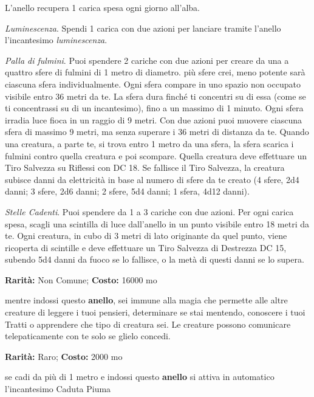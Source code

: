 \begin{multicols}{2}
L'anello recupera 1 carica spesa ogni giorno all'alba.

\emph{Luminescenza}. Spendi 1 carica con due azioni per lanciare tramite l'anello l'incantesimo \emph{luminescenza}.

\emph{Palla di fulmini}. Puoi spendere 2 cariche con due azioni per creare da una a quattro sfere di fulmini di 1 metro di diametro. più sfere crei, meno potente sarà ciascuna sfera individualmente.
Ogni sfera compare in uno spazio non occupato visibile entro 36 metri da te. La sfera dura finché ti concentri su di essa (come se ti concentrassi su di un incantesimo), fino a un massimo di 1 minuto. Ogni sfera irradia luce fioca in un raggio di 9 metri. Con due azioni puoi muovere ciascuna sfera di massimo 9 metri, ma senza superare i 36 metri di distanza da te. Quando una creatura, a parte te, si trova entro 1 metro da una sfera, la sfera scarica i fulmini contro quella creatura e poi scompare. Quella creatura deve effettuare un Tiro Salvezza su Riflessi con DC 18. Se fallisce il Tiro Salvezza, la creatura subisce danni da elettricità in base al numero di sfere da te creato (4 sfere, 2d4 danni; 3 sfere, 2d6 danni; 2 sfere, 5d4 danni; 1 sfera, 4d12 danni).

\emph{Stelle Cadenti}. Puoi spendere da 1 a 3 cariche con due azioni. Per ogni carica spesa, scagli una scintilla di luce dall'anello in un punto visibile entro 18 metri da te. Ogni creatura, in cubo di 3 metri di lato originante da quel punto, viene ricoperta di scintille e deve effettuare un Tiro Salvezza di Destrezza DC 15, subendo 5d4 danni da fuoco se lo fallisce, o la metà di questi danni se lo supera.


\textbf{Rarità:} Non Comune; \textbf{Costo:} 16000 mo

mentre indossi questo \textbf{anello}, sei immune alla magia che permette alle altre creature di leggere i tuoi pensieri, determinare se stai mentendo, conoscere i tuoi Tratti o apprendere che tipo di creatura sei. Le creature possono comunicare telepaticamente con te solo se glielo concedi.


\textbf{Rarità:} Raro; \textbf{Costo:} 2000 mo

se cadi da più di 1 metro e indossi questo \textbf{anello} si attiva in automatico l'incantesimo Caduta Piuma



\end{multicols}
